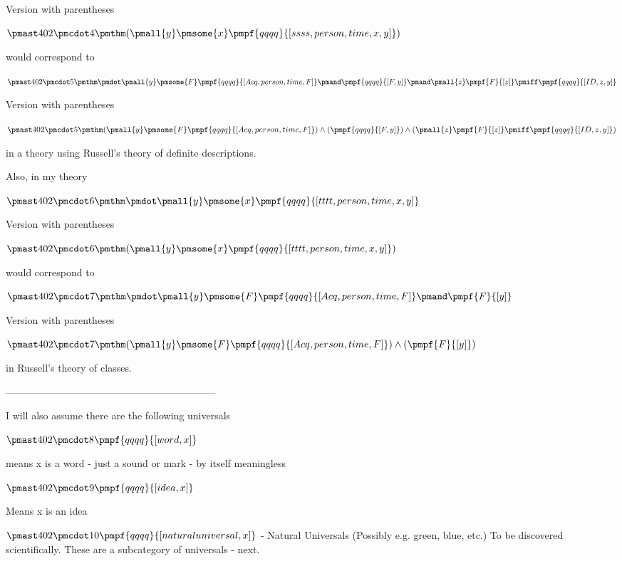 \documentclass[12pt]{article}
\begin{document}
 

Version with parentheses

$\pmast 402 \pmcdot 4 \pmthm  (  \pmall{y}\pmsome{x}\pmpf{qqqq}{[ssss, person, time, x, y]} )$


would correspond to 

$\pmast 402 \pmcdot 5 \pmthm \pmdot \pmall{y} \pmsome{F} \pmpf{qqqq}{[Acq, person,time,F]} \pmand \pmpf{qqqq}{[F, y]} \pmand \pmall{z} \pmpf{F}{[z]} \pmiff \pmpf{qqqq}{[ID,z,y]} $
 
 

Version with parentheses

$\pmast 402 \pmcdot 5 \pmthm  (  \pmall{y}\pmsome{F} \pmpf{qqqq}{[Acq, person,time,F]} ) \land ( \pmpf{qqqq}{[F, y]} ) \land ( \pmall{z}\pmpf{F}{[z]} \pmiff \pmpf{qqqq}{[ID,z,y]} )$


in a theory using Russell's theory of definite descriptions.

Also, in my theory

$\pmast 402 \pmcdot 6 \pmthm \pmdot \pmall{y} \pmsome{x} \pmpf{qqqq}{[tttt, person, time, x, y]} $
 
 

Version with parentheses

$\pmast 402 \pmcdot 6 \pmthm  (  \pmall{y}\pmsome{x}\pmpf{qqqq}{[tttt, person, time, x, y]} )$


would correspond to

$\pmast 402 \pmcdot 7 \pmthm \pmdot \pmall{y} \pmsome{F} \pmpf{qqqq}{[Acq, person,time,F]} \pmand \pmpf{F}{[y]} $
 
 

Version with parentheses

$\pmast 402 \pmcdot 7 \pmthm  (  \pmall{y}\pmsome{F} \pmpf{qqqq}{[Acq, person,time,F]} ) \land ( \pmpf{F}{[y]} )$


in Russell's theory of classes.

---------------------------------------------------------------

I will also assume there are the following universals

$\pmast 402 \pmcdot 8 \pmpf{qqqq}{[word, x]}$

means x is a word - just a sound or mark - by itself meaningless

$\pmast 402 \pmcdot 9 \pmpf{qqqq}{[idea, x]}$

Means x is an idea

$\pmast 402 \pmcdot 10 \pmpf{qqqq}{[naturaluniversal, x]}$ - Natural Universals (Possibly e.g. green, blue, etc.) To be discovered scientifically. These are a subcategory of universals - next.
\end{document}
